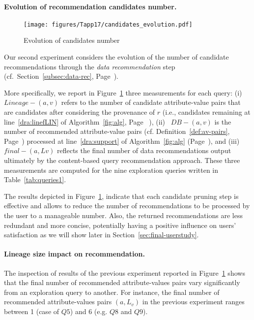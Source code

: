  
  \paragraph*{\textbf{Evolution of recommendation candidates number.}}
  \begin{figure}[b]
\centering
\texttt{[image: figures/Tapp17/candidates\_evolution.pdf]}
\caption{Evolution of candidates number}
\label{fig:candidates_evolution}
\end{figure}
Our second experiment considers the evolution of the number of candidate recommendations through the \emph{data recommendation} step (cf.~Section~\ref{subsec:data-rec}, Page~\pageref{subsec:data-rec}). 

More specifically, we report in Figure~\ref{fig:candidates_evolution} three measurements for each query: (i)~$Lineage-(a,v)$ refers to the number of candidate attribute-value pairs that are candidates after considering the provenance of $r$ (i.e., candidates remaining at line~\ref{dra:linefLIN} of Algorithm~\ref{fig:alg}, Page~\pageref{fig:alg} ), (ii)~ $DB-(a,v)$ is the number of recommended attribute-value pairs (cf. Definition~\ref{def:av-pairs}, Page~\pageref{def:av-pairs}) processed at line~\ref{dra:support} of Algorithm~\ref{fig:alg} (Page~\pageref{fig:alg}), and (iii)~ $final-(a,Lv)$ reflects the final number of data recommendations output ultimately by the content-based query recommendation approach. These three measurements are computed for the nine exploration queries written in Table~\ref{tab:queries1}.


The results depicted in Figure~\ref{fig:candidates_evolution}, indicate that each candidate pruning step is effective and allows to reduce the number of recommendations to be processed by the user to a manageable number. 
Also, the returned recommendations are less redundant and more concise, potentially having a positive influence on users' satisfaction as we will show later in Section~\ref{sec:final-userstudy}.




  \paragraph*{\textbf{Lineage size impact on recommendation.}}

The inspection of results of the previous experiment reported in Figure~\ref{fig:candidates_evolution} shows that the final number of recommended attribute-values pairs vary significantly from an exploration query to another. For instance, the final number of recommended attribute-values pairs $(a,L_v)$ in the previous experiment ranges between  1 (case of $Q5$) and 6 (e.g. $Q8$ and $Q9$).

